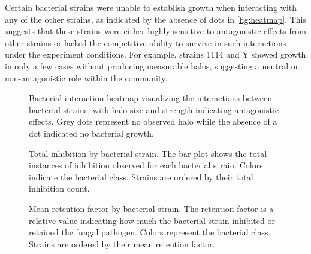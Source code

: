 Certain bacterial strains were unable to establish growth when interacting with any of the other strains, as indicated by the absence of dots in \autoref{fig:heatmap}. This suggests that these strains were either highly sensitive to antagonistic effects from other strains or lacked the competitive ability to survive in such interactions under the experiment conditions. 
For example, strains 1114 and Y showed growth in only a few cases without producing measurable halos, suggesting a neutral or non-antagonistic role within the community.
\begin{figure}[H]
    \centering
    \setlength{\abovecaptionskip}{-30pt} %
    \makebox[\textwidth]{ %
        
    }
    \caption{Bacterial interaction heatmap visualizing the interactions between bacterial strains, with halo size and strength indicating antagonistic effects. Grey dots represent no observed halo while the absence of a dot indicated no bacterial growth.}
    \label{fig:heatmap}
\end{figure}

\begin{figure}[H]
    \centering
    \footnotesize
    \setlength{\abovecaptionskip}{-30pt} %
    \makebox[\textwidth]{ %
        
    }
    \caption{Total inhibition by bacterial strain. The bar plot shows the total instances of inhibition observed for each bacterial strain. Colors indicate the bacterial class. Strains are ordered by their total inhibition count.}
    \label{fig:inhibition}
\end{figure}
\vspace{0.5cm} %

\begin{figure}[H]
    \centering
    \footnotesize
    \setlength{\abovecaptionskip}{-30pt} %
    \makebox[\textwidth]{ %
        
    }
    \caption{Mean retention factor by bacterial strain. The retention factor is a relative value indicating how much the bacterial strain inhibited or retained the fungal pathogen. Colors represent the bacterial class. Strains are ordered by their mean retention factor.}
    \label{fig:retention}
\end{figure}
\vspace{0.5cm} %


